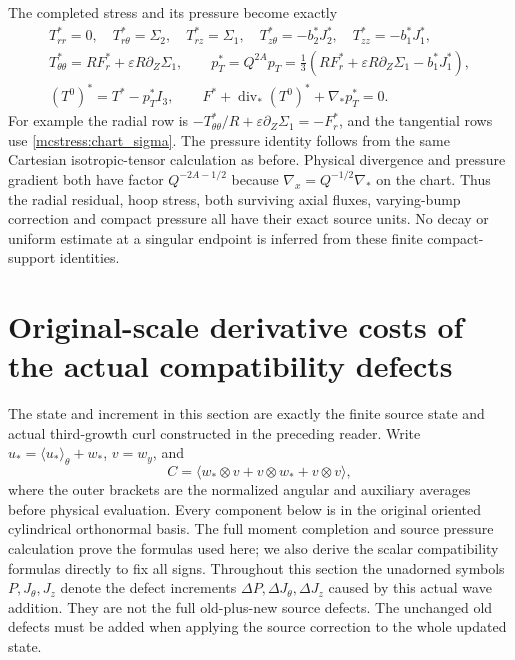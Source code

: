 \documentclass[11pt]{article}
\begin{document}
The completed stress and its pressure become exactly
\begin{equation}\label{mcstress:chart_tensor}
\begin{gathered}
 T^*_{rr}=0,\quad T^*_{r\theta}=\Sigma_2,\quad
 T^*_{rz}=\Sigma_1,\quad T^*_{z\theta}=-b_2^*J_2^*,\quad
 T^*_{zz}=-b_1^*J_1^*,\\
 T^*_{\theta\theta}=RF_r^*+\varepsilon R\partial_Z\Sigma_1,
 \qquad
 p_T^*=Q^{2A}p_T
  =\tfrac13(RF_r^*+\varepsilon R\partial_Z\Sigma_1-b_1^*J_1^*),\\
 (T^0)^*=T^*-p_T^*I_3,\qquad
 F^*+\operatorname{div}_*(T^0)^*+\nabla_*p_T^*=0.
\end{gathered}
\end{equation}
For example the radial row is
$-T^*_{\theta\theta}/R+\varepsilon\partial_Z\Sigma_1=-F_r^*$,
and the tangential rows use \eqref{mcstress:chart_sigma}. The pressure
identity follows from the same Cartesian isotropic-tensor calculation
as before. Physical divergence and pressure gradient both have factor
$Q^{-2A-1/2}$ because $\nabla_x=Q^{-1/2}\nabla_*$ on the chart.
Thus the radial residual, hoop stress, both surviving axial fluxes,
varying-bump correction and compact pressure all have their exact
source units. No decay or uniform estimate at a singular endpoint is
inferred from these finite compact-support identities.


\section{Original-scale derivative costs of the actual compatibility defects}
\label{mcq:section}

The state and increment in this section are exactly the finite source state
and actual third-growth curl constructed in the preceding reader.
Write \(u_*=\langle u_*\rangle_\theta+w_*\), \(v=w_y\), and
\[
 C=\langle w_*\otimes v+v\otimes w_*+v\otimes v\rangle,
\]
where the outer brackets are the normalized angular and auxiliary
averages before physical evaluation. Every component below is in the
original oriented cylindrical orthonormal basis. The full moment
completion and source pressure calculation prove the formulas used here;
we also derive the scalar compatibility formulas directly to fix all signs.
Throughout this section the unadorned symbols \(P,J_\theta,J_z\)
denote the defect increments \(\Delta P,\Delta J_\theta,\Delta J_z\)
caused by this actual wave addition. They are not the full old-plus-new
source defects. The unchanged old defects must be added when applying
the source correction to the whole updated state.
\end{document}
